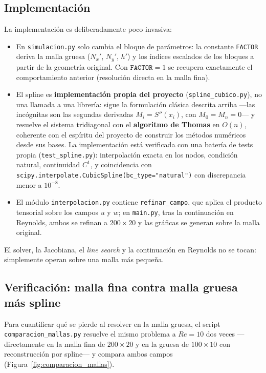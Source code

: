 \documentclass[12pt, a4paper]{article}
\begin{document}
\subsection{Implementación}

La implementación es deliberadamente poco invasiva:

\begin{itemize}
  \item En \texttt{simulacion.py} solo cambia el bloque de parámetros: la
        constante \texttt{FACTOR} deriva la malla gruesa ($N_x'$, $N_y'$,
        $h'$) y los índices escalados de los bloques a partir de la
        geometría original. Con $\texttt{FACTOR} = 1$ se recupera
        exactamente el comportamiento anterior (resolución directa en la
        malla fina).
  \item El spline es \textbf{implementación propia del proyecto}
        (\texttt{spline\_cubico.py}), no una llamada a una librería: sigue
        la formulación clásica descrita arriba —las incógnitas son las
        segundas derivadas $M_i = S''(x_i)$, con $M_0 = M_n = 0$— y
        resuelve el sistema tridiagonal con el \textbf{algoritmo de Thomas}
        en $O(n)$, coherente con el espíritu del proyecto de construir los
        métodos numéricos desde sus bases. La implementación está
        verificada con una batería de tests propia
        (\texttt{test\_spline.py}): interpolación exacta en los nodos,
        condición natural, continuidad $C^{1}$, y coincidencia con
        \texttt{scipy.interpolate.CubicSpline(bc\_type="natural")} con
        discrepancia menor a $10^{-8}$.
  \item El módulo \texttt{interpolacion.py} contiene
        \texttt{refinar\_campo}, que aplica el producto tensorial sobre los
        campos $u$ y $w$; en \texttt{main.py}, tras la continuación en
        Reynolds, ambos se refinan a $200\times20$ y las gráficas se
        generan sobre la malla original.
\end{itemize}

El solver, la Jacobiana, el \emph{line search} y la continuación en Reynolds
no se tocan: simplemente operan sobre una malla más pequeña.

\subsection{Verificación: malla fina contra malla gruesa más spline}

Para cuantificar qué se pierde al resolver en la malla gruesa, el script
\texttt{comparacion\_mallas.py} resuelve el mismo problema a $Re = 10$ dos
veces —directamente en la malla fina de $200\times20$ y en la gruesa de
$100\times10$ con reconstrucción por spline— y compara ambos campos
(Figura~\ref{fig:comparacion_mallas}).
\end{document}

